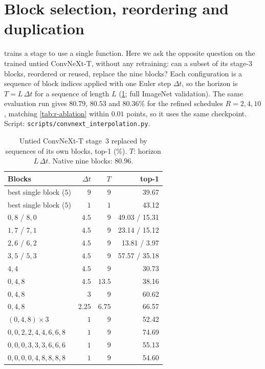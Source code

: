 \section{Block selection, reordering and duplication}
\label{app:block-ops}

 trains a stage to use a single function.
Here we ask the opposite question on the trained untied ConvNeXt-T, without any
retraining: can a subset of its stage-3 blocks, reordered or reused, replace the nine
blocks?
Each configuration is a sequence of block indices applied with one Euler step
$\Delta t$, so the horizon is $T{=}L\,\Delta t$ for a sequence of length $L$
(\cref{tab:app-block-ops}; full ImageNet validation).
The same evaluation run gives $80.79$, $80.53$ and $80.36\%$ for the refined schedules
$R{=}2,4,10$, matching \cref{tab:r-ablation} within $0.01$ points, so it uses the
same checkpoint.
Script: \texttt{scripts/convnext\_interpolation.py}.

\begin{table}[t]
    \centering
    \caption{Untied ConvNeXt-T stage~3 replaced by sequences of its own blocks, top-1
    (\%). $T$: horizon $L\,\Delta t$. Native nine blocks: $80.96$.}
    \label{tab:app-block-ops}
    \small
    \setlength{\tabcolsep}{3pt}
    \begin{tabular}{lrrr}
        \toprule
        Blocks & $\Delta t$ & $T$ & top-1 \\
        \midrule
        best single block ($5$)           & $9$   & $9$    & 39.67 \\
        best single block ($5$)           & $1$   & $1$    & 43.12 \\
        $0,8$ / $8,0$                     & $4.5$ & $9$    & 49.03 / 15.31 \\
        $1,7$ / $7,1$                     & $4.5$ & $9$    & 23.14 / 15.12 \\
        $2,6$ / $6,2$                     & $4.5$ & $9$    & 13.81 / 3.97 \\
        $3,5$ / $5,3$                     & $4.5$ & $9$    & 57.57 / 35.18 \\
        $4,4$                             & $4.5$ & $9$    & 30.73 \\
        $0,4,8$                           & $4.5$ & $13.5$ & 38.16 \\
        $0,4,8$                           & $3$   & $9$    & 60.62 \\
        $0,4,8$                           & $2.25$& $6.75$ & 66.57 \\
        $(0,4,8)\times3$                  & $1$   & $9$    & 52.42 \\
        $0,0,2,2,4,4,6,6,8$               & $1$   & $9$    & 74.69 \\
        $0,0,0,3,3,3,6,6,6$               & $1$   & $9$    & 55.13 \\
        $0,0,0,0,4,8,8,8,8$               & $1$   & $9$    & 54.60 \\
        \bottomrule
    \end{tabular}
\end{table}

